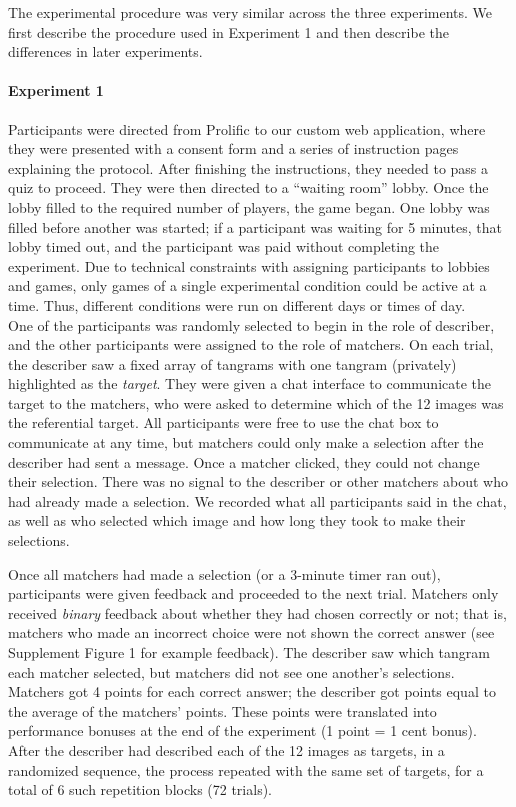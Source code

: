 \documentclass[
  english,
]{article}
\begin{document}
The experimental procedure was very similar across the three experiments.
We first describe the procedure used in Experiment 1 and then describe the differences in later experiments.

\paragraph{Experiment 1}

Participants were directed from Prolific to our custom web application, where they were presented with a consent form and a series of instruction pages explaining the protocol.
After finishing the instructions, they needed to pass a quiz to proceed.
They were then directed to a ``waiting room'' lobby.
Once the lobby filled to the required number of players, the game began. One lobby was filled before another was started; if a participant was waiting for 5 minutes, that lobby timed out, and the participant was paid without completing the experiment. Due to technical constraints with assigning participants to lobbies and games, only games of a single experimental condition could be active at a time. Thus, different conditions were run on different days or times of day.\\
One of the participants was randomly selected to begin in the role of describer, and the other participants were assigned to the role of matchers.
On each trial, the describer saw a fixed array of tangrams with one tangram (privately) highlighted as the \emph{target}.
They were given a chat interface to communicate the target to the matchers, who were asked to determine which of the 12 images was the referential target.
All participants were free to use the chat box to communicate at any time, but matchers could only make a selection after the describer had sent a message.
Once a matcher clicked, they could not change their selection.
There was no signal to the describer or other matchers about who had already made a selection.
We recorded what all participants said in the chat, as well as who selected which image and how long they took to make their selections.

Once all matchers had made a selection (or a 3-minute timer ran out), participants were given feedback and proceeded to the next trial.
Matchers only received \emph{binary} feedback about whether they had chosen correctly or not; that is, matchers who made an incorrect choice were not shown the correct answer (see Supplement Figure 1 for example feedback).
The describer saw which tangram each matcher selected, but matchers did not see one another's selections.
Matchers got 4 points for each correct answer; the describer got points equal to the average of the matchers' points.
These points were translated into performance bonuses at the end of the experiment (1 point = 1 cent bonus).
After the describer had described each of the 12 images as targets, in a randomized sequence, the process repeated with the same set of targets, for a total of 6 such repetition blocks (72 trials).
\end{document}
